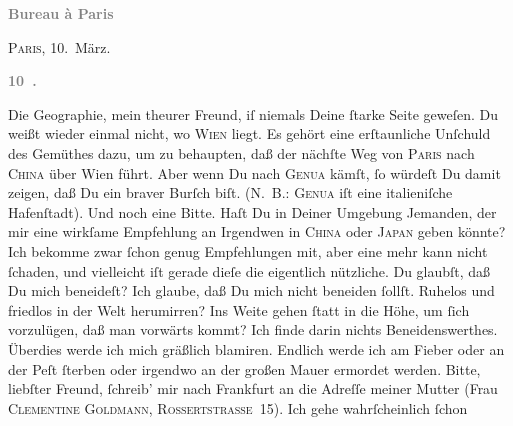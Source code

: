 {\begin{ledgroupsized}[t]{13cm}
           \pstart
           \begin{otherlanguage}{french}\textcolor{gray}{\textbf{\textbf{Bureau à Paris}}}\end{otherlanguage}\hfill \textsc{Paris}, 10. März.\pend
           \pstart
           \begin{otherlanguage}{french}\textcolor{gray}{\textbf{\textbf{10 .}}}\end{otherlanguage}\pend
           \pstart
           Die Geographie, mein theurer Freund, iſ niemals Deine
               ſtarke Seite geweſen. Du weißt wieder einmal nicht, wo \textsc{Wien} liegt. Es gehört eine erſtaunliche Unſchuld des Gemüthes dazu, um zu behaupten,
               daß der nächſte Weg von \textsc{Paris} nach \textsc{China} über Wien führt. Aber wenn Du nach \textsc{Genua} kämſt, ſo würdeſt Du damit zeigen, daß Du ein braver Burſch biſt. \introOben{}(\textsc{N. B.: Genua} iſt eine italieniſche
                  Hafenſtadt).\introOben{}\pend
           \pstart
            Und noch eine Bitte. Haſt Du in Deiner Umgebung Jemanden, {\pb}der mir eine wirkſame Empfehlung an Irgendwen in \textsc{China} oder \textsc{Japan} geben könnte? Ich bekomme zwar ſchon genug Empfehlungen mit, aber eine mehr
               kann nicht ſchaden, und vielleicht iſt gerade dieſe die eigentlich\strikeout{\textcolor{gray}{e}} nützliche.\pend
           \pstart
           Du glaubſt, daß Du mich beneideſt? Ich glaube, daß Du mich nicht beneiden ſollſt.
               Ruhelos und friedlos in der Welt herumirren?  Ins Weite gehen ſtatt in die Höhe, um ſich
               vorzulügen, daß man {\pb}vorwärts kommt? Ich finde darin
               nichts Beneidenswerthes. Überdies werde ich mich gräßlich  blamiren. Endlich werde ich \strikeout{\textcolor{gray}{a}} am Fieber \introOben{}oder\introOben{} an der Peſt  ſterben oder irgendwo an der großen Mauer ermordet werden.\pend
           \pstart
           Bitte, liebſter Freund, ſchreib’ mir nach Frankfurt an die Adreſſe meiner Mutter (Frau \textsc{Clementine Goldmann}, \textsc{Rossertstraße} 15). Ich gehe wahrſcheinlich ſchon

\end{ledgroupsized}}
